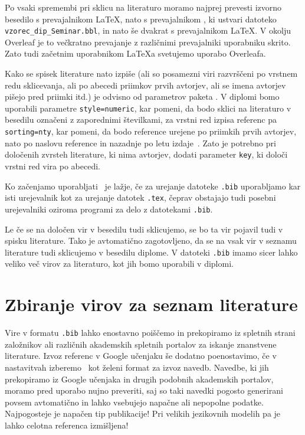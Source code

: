 \documentclass[a4paper,12pt,openright]{book}
\begin{document}
Po vsaki spremembi pri sklicu na literaturo moramo najprej prevesti izvorno besedilo s prevajalnikom \LaTeX, nato s prevajalnikom  \BibLaTeX, ki ustvari datoteko  {\tt vzorec\_dip\_Seminar.bbl}, in nato še dvakrat s prevajalnikom  \LaTeX.
V okolju Overleaf je to večkratno prevajanje z različnimi prevajalniki uporabniku skrito. Zato tudi začetnim uporabnikom \LaTeX a svetujemo uporabo Overleafa.

Kako se spisek literature nato izpiše (ali so posamezni viri razvrščeni po vrstnem redu sklicevanja, ali po abecedi priimkov prvih avtorjev, ali se imena avtorjev pišejo pred priimki itd.) je odvisno od parametrov paketa \BibLaTeX.
V diplomi bomo uporabili parametre
\texttt{style=numeric}, kar pomeni, da bodo sklici na literaturo v besedilu označeni z zaporednimi številkami, za vrstni red izpisa referenc pa
\texttt{sorting=nty}, kar pomeni, da bodo reference urejene po priimkih prvih avtorjev, nato po naslovu reference in nazadnje po letu izdaje~\cite{ctan}.
Zato je potrebno pri določenih zvrsteh literature, ki nima avtorjev, dodati parameter \texttt{key}, ki določi vrstni red vira po abecedi.

Ko začenjamo uporabljati \BibLaTeX\ je lažje, če za urejanje datoteke \texttt{.bib} uporabljamo kar isti urejevalnik kot za urejanje datotek \texttt{.tex},
čeprav obstajajo tudi posebni urejevalniki oziroma programi za delo z datotekami \texttt{.bib}.

Le če se  na določen vir v besedilu tudi sklicujemo, se bo ta vir pojavil tudi v spisku literature.
Tako je avtomatično zagotovljeno, da se na vsak vir v seznamu literature tudi sklicujemo v besedilu diplome.
V datoteki \texttt{.bib} imamo sicer lahko veliko več virov za literaturo, kot jih bomo uporabili v diplomi.

\section{Zbiranje virov za seznam literature}

Vire v formatu \texttt{.bib}  lahko enostavno poiščemo in prekopiramo iz spletnih strani založnikov ali različnih akademskih spletnih portalov za iskanje znanstvene literature.
Izvoz  referenc v Google učenjaku še dodatno poenostavimo, če v nastavitvah izberemo \BibTeX\ kot želeni format za izvoz navedb. Navedbe, ki jih  prekopiramo iz Google učenjaka in drugih podobnih akademskih portalov, moramo pred uporabo nujno preveriti, saj so taki navedki pogosto generirani povsem avtomatično in lahko vsebujejo napačne ali nepopolne podatke. Najpogosteje je napačen tip publikacije! Pri velikih jezikovnih modelih pa je lahko celotna referenca izmišljena!
\end{document}
